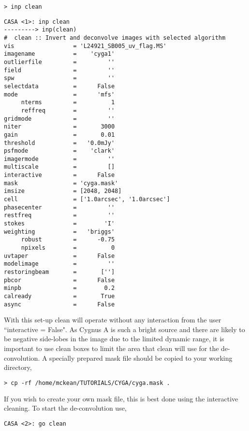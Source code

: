 \begin{verbatim}
> inp clean
\end{verbatim}
\begin{lstlisting}
CASA <1>: inp clean
---------> inp(clean)
#  clean :: Invert and deconvolve images with selected algorithm
vis                 = 'L24921_SB005_uv_flag.MS' 
imagename           =    'cyga1'       
outlierfile         =         ''        
field               =         ''       
spw                 =         ''        
selectdata          =      False        
mode                =      'mfs'        
     nterms         =          1        
     reffreq        =         ''       
gridmode            =         ''        
niter               =       3000        
gain                =       0.01        
threshold           =   '0.0mJy'        
psfmode             =    'clark'        
imagermode          =         ''        
multiscale          =         []        
interactive         =      False        
mask                = 'cyga.mask'       
imsize              = [2048, 2048]      
cell                = ['1.0arcsec', '1.0arcsec'] 
phasecenter         =         ''        
restfreq            =         ''       
stokes              =        'I'        
weighting           =   'briggs'        
     robust         =      -0.75        
     npixels        =          0        
uvtaper             =      False       
modelimage          =         ''        
restoringbeam       =       ['']       
pbcor               =      False        
minpb               =        0.2        
calready            =       True       
async               =      False        
\end{lstlisting}

With this set-up clean will operate without any interaction from the user ``interactive = False". As Cygnus A is such a bright source and there are likely to be negative side-lobes in the image due to the limited dynamic range, it is important to use clean boxes to limit the area that clean will use for the de-convolution. A specially prepared mask file should be copied to your working directory,
\begin{verbatim}
> cp -rf /home/mckean/TUTORIALS/CYGA/cyga.mask .
\end{verbatim}

If you wish to create your own mask file, this is best done using the interactive cleaning. To start the de-convolution use,

\begin{verbatim}
CASA <2>: go clean
\end{verbatim}

